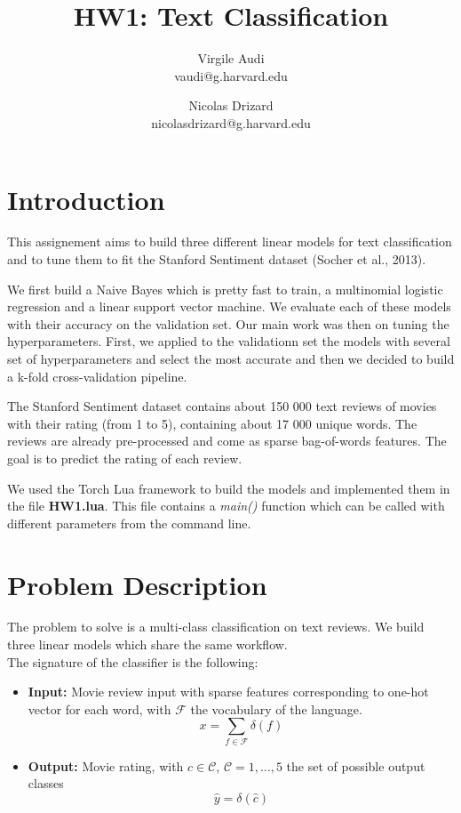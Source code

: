 \documentclass[11pt]{article}
\title{HW1: Text Classification}
\author{Virgile Audi \\ vaudi@g.harvard.edu \and Nicolas Drizard \\ nicolasdrizard@g.harvard.edu }
\begin{document}
\maketitle{}
\section{Introduction}

This assignement aims to build three different linear models for text classification and to tune them to fit the Stanford Sentiment dataset (Socher et al., 2013).

We first build a Naive Bayes which is pretty fast to train, a multinomial logistic regression and a linear support vector machine. We evaluate each of these models with their accuracy on the validation set. Our main work was then on tuning the hyperparameters. First, we applied to the validationn set the models with several set of hyperparameters and select the most accurate and then we decided to build a k-fold cross-validation pipeline.

The Stanford Sentiment dataset contains about 150 000 text reviews of movies with their rating (from 1 to 5), containing about 17 000 unique words. The reviews are already pre-processed and come as sparse bag-of-words features. The goal is to predict the rating of each review.

We used the Torch Lua framework to build the models and implemented them in the file \textbf{HW1.lua}. This file contains a \textit{main()} function which can be called with different parameters from the command line.


\section{Problem Description}

The problem to solve is a multi-class classification on text reviews. We build three linear models which share the same workflow.\\

\noindent The signature of the classifier is the following:

\begin{itemize}
	\item \textbf{Input:} Movie review input with sparse features corresponding to one-hot vector for each word, with $\mathcal{F}$ the vocabulary of the language.
	\[ x = \sum_{f \in \mathcal{F}} \delta(f) \]
	\item \textbf{Output:} Movie rating, with $c \in \mathcal{C}$, $\mathcal{C} = {1, \hdots, 5}$ the set of possible output classes
	\[ \hat{y} = \delta(\hat{c})\]
\end{itemize}
\end{document}
